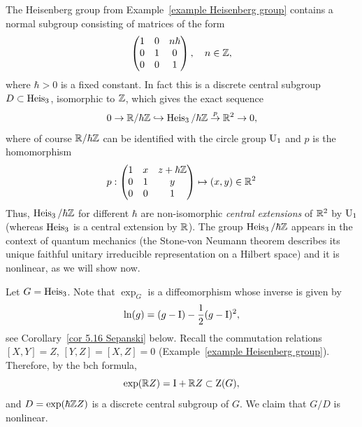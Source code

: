 \begin{example}\label{example quantum heisenberg}
    The Heisenberg group from Example~\ref{example Heisenberg group} contains a normal subgroup consisting of matrices of the form
    \[
    \begin{pmatrix}
        1&0&n\hbar\\
        0&1&0\\
        0&0&1
    \end{pmatrix},\quad n\in\mathbb{Z},
    \]
    where $\hbar >0$ is a fixed constant. In fact this is a discrete central subgroup $D\subset \operatorname{Heis}_3$, isomorphic to $\mathbb{Z}$, which gives the exact sequence
    \[0\to \mathbb{R}\slash \hbar\mathbb{Z}\hookrightarrow \operatorname{Heis}_3\slash \hbar\mathbb{Z} \overset{p}{\to} \mathbb{R}^2\to 0,\]
    where of course $\mathbb{R}\slash\hbar\mathbb{Z}$ can be identified with the circle group $\operatorname{U}_1$ and $p$ is the homomorphism
    \[p: 
     \begin{pmatrix}
        1&x&z+\hbar\mathbb{Z}\\
        0&1&y\\
        0&0&1
    \end{pmatrix}
    \mapsto (x,y)\in\mathbb{R}^2
    \]
    Thus, $\operatorname{Heis}_3\slash\hbar \mathbb{Z}$ for different $\hbar$ are non-isomorphic \emph{central extensions} of $\mathbb{R}^2$ by $\operatorname{U}_1$ (whereas $\operatorname{Heis}_3$ is a central extension by $\mathbb{R}$). The group $\operatorname{Heis}_3\slash \hbar\mathbb{Z}$ appears in the context of quantum mechanics (the Stone-von Neumann theorem describes its unique faithful unitary irreducible representation on a Hilbert space) and it is nonlinear, as we will show now.
    
    Let $G=\operatorname{Heis}_3$. Note that $\exp_G$ is a diffeomorphism whose inverse is given by 
    \[\ln(g)=(g-\mathrm{I})-\frac12(g-\mathrm{I})^2,\]
    see Corollary~\ref{cor 5.16 Sepanski} below. Recall the commutation relations $[X,Y]=Z$, $[Y,Z]=[X,Z]=0$ (Example~\ref{example Heisenberg group}). Therefore, by the \gls{bch} formula,
    \[\exp(\mathbb{R} Z)=\mathrm{I}+\mathbb{R} Z\subset \mathrm{Z}(G),\]
    and $D=\exp(\hbar\mathbb{Z} Z)$ is a discrete central subgroup of $G$. We claim that $G\slash D$ is nonlinear.


\end{example}

